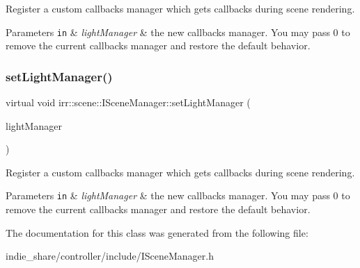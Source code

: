 Register a custom callbacks manager which gets callbacks during scene rendering. 


\begin{DoxyParams}[1]{Parameters}
\mbox{\tt in}  & {\em light\+Manager} & the new callbacks manager. You may pass 0 to remove the current callbacks manager and restore the default behavior. \\
\hline
\end{DoxyParams}
\mbox{\label{classirr_1_1scene_1_1ISceneManager_a0065307bf3ff12fdc5b7bb624987a1c2}} 
\subsubsection{\texorpdfstring{set\+Light\+Manager()}{setLightManager()}\hspace{0.1cm}{\footnotesize\ttfamily [2/2]}}
{\footnotesize\ttfamily virtual void irr\+::scene\+::\+I\+Scene\+Manager\+::set\+Light\+Manager (\begin{DoxyParamCaption}\item[{\hyperlink{classirr_1_1scene_1_1ILightManager}{I\+Light\+Manager} $\ast$}]{light\+Manager }\end{DoxyParamCaption})\hspace{0.3cm}{\ttfamily [pure virtual]}}



Register a custom callbacks manager which gets callbacks during scene rendering. 


\begin{DoxyParams}[1]{Parameters}
\mbox{\tt in}  & {\em light\+Manager} & the new callbacks manager. You may pass 0 to remove the current callbacks manager and restore the default behavior. \\
\hline
\end{DoxyParams}


The documentation for this class was generated from the following file\+:\begin{DoxyCompactItemize}
\item 
indie\+\_\+share/controller/include/I\+Scene\+Manager.\+h\end{DoxyCompactItemize}
